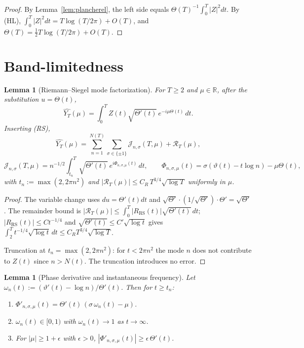 \documentclass[11pt]{article}
\newtheorem{lemma}[theorem]{Lemma}
\theoremstyle{definition}
\theoremstyle{remark}
\newcommand{\R}{\mathbb{R}}
\begin{document}
\begin{proof}
By Lemma~\ref{lem:plancherel}, the left side equals $\Theta(T)^{-1}\int_0^T |Z|^2 dt$. By (HL), $\int_0^T |Z|^2 dt = T\log(T/2\pi) + O(T)$, and $\Theta(T) = \tfrac12 T\log(T/2\pi) + O(T)$.
\end{proof}

\section{Band-limitedness}

\begin{lemma}[Riemann--Siegel mode factorization]\label{lem:modes}
For $T \geq 2$ and $\mu \in \R$, after the substitution $u = \Theta(t)$,
\[
\widehat{Y_T}(\mu) = \int_0^T Z(t) \sqrt{\Theta'(t)}\, e^{-i\mu\Theta(t)}\, dt.
\]
Inserting (RS),
\[
\widehat{Y_T}(\mu) = \sum_{n=1}^{N(T)}\sum_{\sigma \in \{\pm 1\}} \mathcal J_{n,\sigma}(T,\mu) + \mathcal R_T(\mu),
\]
\[
\mathcal J_{n,\sigma}(T,\mu) = n^{-1/2}\int_{t_n}^T \sqrt{\Theta'(t)}\, e^{i\Phi_{n,\sigma,\mu}(t)}\, dt,
\qquad \Phi_{n,\sigma,\mu}(t) = \sigma(\vartheta(t) - t\log n) - \mu\Theta(t),
\]
with $t_n := \max(2, 2\pi n^2)$ and $|\mathcal R_T(\mu)| \leq C_R\, T^{3/4}\sqrt{\log T}$ uniformly in $\mu$.
\end{lemma}

\begin{proof}
The variable change uses $du = \Theta'(t)dt$ and $\sqrt{\Theta'}\cdot(1/\sqrt{\Theta'})\cdot \Theta' = \sqrt{\Theta'}$. The remainder bound is $|\mathcal R_T(\mu)| \leq \int_0^T |R_{\mathrm{RS}}(t)|\sqrt{\Theta'(t)}\, dt$; $|R_{\mathrm{RS}}(t)| \leq C t^{-1/4}$ and $\sqrt{\Theta'(t)} \leq C'\sqrt{\log t}$ gives $\int_2^T t^{-1/4}\sqrt{\log t}\, dt \leq C_R T^{3/4}\sqrt{\log T}$.

Truncation at $t_n = \max(2,2\pi n^2)$: for $t < 2\pi n^2$ the mode $n$ does not contribute to $Z(t)$ since $n > N(t)$. The truncation introduces no error.
\end{proof}

\begin{lemma}[Phase derivative and instantaneous frequency]\label{lem:phase}
Let $\omega_n(t) := (\vartheta'(t) - \log n)/\Theta'(t)$. Then for $t \geq t_n$:
\begin{enumerate}
\item[(i)] $\Phi'_{n,\sigma,\mu}(t) = \Theta'(t)\,(\sigma\,\omega_n(t) - \mu)$.
\item[(ii)] $\omega_n(t) \in [0,1)$ with $\omega_n(t) \to 1$ as $t \to \infty$.
\item[(iii)] For $|\mu| \geq 1+\epsilon$ with $\epsilon > 0$, $|\Phi'_{n,\sigma,\mu}(t)| \geq \epsilon\,\Theta'(t)$.
\end{enumerate}
\end{lemma}
\end{document}
